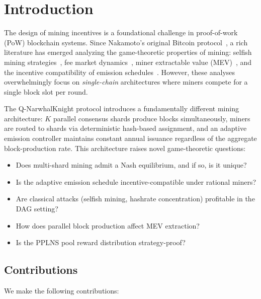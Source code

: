 \documentclass[11pt,a4paper]{article}
\theoremstyle{definition}
\theoremstyle{remark}
\newcommand{\QNK}{\textsf{Q-NarwhalKnight}}
\begin{document}
\tableofcontents
\newpage

\section{Introduction}\label{sec:intro}

The design of mining incentives is a foundational challenge in
proof-of-work (PoW) blockchain systems.
Since Nakamoto's original Bitcoin protocol~\cite{nakamoto2008bitcoin},
a rich literature has emerged analyzing the game-theoretic properties
of mining: selfish mining strategies~\cite{eyal2014selfish}, fee market
dynamics~\cite{roughgarden2021transaction}, miner extractable value
(MEV)~\cite{daian2020flashboys}, and the incentive compatibility of
emission schedules~\cite{carlsten2016instability}.
However, these analyses overwhelmingly focus on \emph{single-chain}
architectures where miners compete for a single block slot per round.

The \QNK{} protocol introduces a fundamentally different mining
architecture: $K$ parallel consensus shards produce blocks simultaneously,
miners are routed to shards via deterministic hash-based assignment,
and an adaptive emission controller maintains constant annual issuance
regardless of the aggregate block-production rate.
This architecture raises novel game-theoretic questions:
\begin{itemize}[leftmargin=*,nosep]
  \item Does multi-shard mining admit a Nash equilibrium, and if so,
    is it unique?
  \item Is the adaptive emission schedule incentive-compatible under
    rational miners?
  \item Are classical attacks (selfish mining, hashrate concentration)
    profitable in the DAG setting?
  \item How does parallel block production affect MEV extraction?
  \item Is the PPLNS pool reward distribution strategy-proof?
\end{itemize}

\subsection{Contributions}

We make the following contributions:
\end{document}
